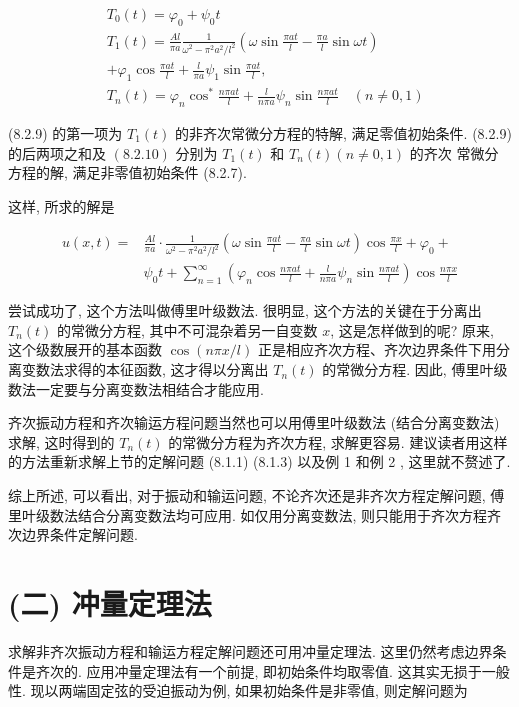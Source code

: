 \begin{solution}
$$
\begin{aligned}
& T_{0}(t)=\varphi_{0}+\psi_{0} t \\
& T_{1}(t)=\frac{A l}{\pi a} \frac{1}{\omega^{2}-\pi^{2} a^{2} / l^{2}}\left(\omega \sin \frac{\pi a t}{l}-\frac{\pi a}{l} \sin \omega t\right) \\
&+\varphi_{1} \cos \frac{\pi a t}{l}+\frac{l}{\pi a} \psi_{1} \sin \frac{\pi a t}{l}, \\
& T_{n}(t)=\varphi_{n} \cos ^{*} \frac{n \pi a t}{l}+\frac{l}{n \pi a} \psi_{n} \sin \frac{n \pi a t}{l} \quad(n \neq 0,1)
\end{aligned}
$$

(8.2.9) 的第一项为 $T_{1}(t)$ 的非齐次常微分方程的特解, 满足零值初始条件. (8.2.9) 的后两项之和及 $(8.2 .10)$ 分别为 $T_{1}(t)$ 和 $T_{n}(t)(n \neq 0,1)$ 的齐次
常微分方程的解, 满足非零值初始条件 (8.2.7).

这样, 所求的解是

$$
\begin{aligned}
u(x, t)= & \frac{A l}{\pi a} \cdot \frac{1}{\omega^{2}-\pi^{2} a^{2} / l^{2}}\left(\omega \sin \frac{\pi a t}{l}-\frac{\pi a}{l} \sin \omega t\right) \cos \frac{\pi x}{l}+\varphi_{0}+ \\
& \psi_{0} t+\sum_{n=1}^{\infty}\left(\varphi_{n} \cos \frac{n \pi a t}{l}+\frac{l}{n \pi a} \psi_{n} \sin \frac{n \pi a t}{l}\right) \cos \frac{n \pi x}{l}
\end{aligned}
$$

尝试成功了, 这个方法叫做傅里叶级数法. 很明显, 这个方法的关键在于分离出 $T_{n}(t)$ 的常微分方程, 其中不可混杂着另一自变数 $x$, 这是怎样做到的呢? 原来, 这个级数展开的基本函数 $\cos (n \pi x / l)$ 正是相应齐次方程、齐次边界条件下用分离变数法求得的本征函数, 这才得以分离出 $T_{n}(t)$ 的常微分方程. 因此, 傅里叶级数法一定要与分离变数法相结合才能应用.

齐次振动方程和齐次输运方程问题当然也可以用傅里叶级数法 (结合分离变数法) 求解, 这时得到的 $T_{n}(t)$ 的常微分方程为齐次方程, 求解更容易. 建议读者用这样的方法重新求解上节的定解问题 (8.1.1) (8.1.3) 以及例 1 和例 2 , 这里就不赘述了.

综上所述, 可以看出, 对于振动和输运问题, 不论齐次还是非齐次方程定解问题, 傅里叶级数法结合分离变数法均可应用. 如仅用分离变数法, 则只能用于齐次方程齐次边界条件定解问题.

\section{(二) 冲量定理法}
求解非齐次振动方程和输运方程定解问题还可用冲量定理法. 这里仍然考虑边界条件是齐次的. 应用冲量定理法有一个前提, 即初始条件均取零值. 这其实无损于一般性. 现以两端固定弦的受迫振动为例, 如果初始条件是非零值, 则定解问题为


\end{solution}
